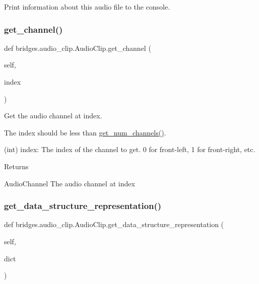 Print information about this audio file to the console. 

\mbox{\label{classbridges_1_1audio__clip_1_1_audio_clip_a9e322508117351585d6f3d22e2ccb3bc}} 
\subsubsection{\texorpdfstring{get\+\_\+channel()}{get\_channel()}}
{\footnotesize\ttfamily def bridges.\+audio\+\_\+clip.\+Audio\+Clip.\+get\+\_\+channel (\begin{DoxyParamCaption}\item[{}]{self,  }\item[{}]{index }\end{DoxyParamCaption})}



Get the audio channel at index. 

The index should be less than \hyperlink{classbridges_1_1audio__clip_1_1_audio_clip_af881900e292374fabf1f53a253571e5f}{get\+\_\+num\+\_\+channels()}. \begin{DoxyVerb}       (int) index: The index of the channel to get. 0 for front-left, 1 for front-right, etc.
\end{DoxyVerb}
 \begin{DoxyReturn}{Returns}


Audio\+Channel The audio channel at index 
\end{DoxyReturn}
\mbox{\label{classbridges_1_1audio__clip_1_1_audio_clip_a58dcd978d0a48dd338f850d7fea3d993}} 
\subsubsection{\texorpdfstring{get\+\_\+data\+\_\+structure\+\_\+representation()}{get\_data\_structure\_representation()}}
{\footnotesize\ttfamily def bridges.\+audio\+\_\+clip.\+Audio\+Clip.\+get\+\_\+data\+\_\+structure\+\_\+representation (\begin{DoxyParamCaption}\item[{}]{self,  }\item[{}]{dict }\end{DoxyParamCaption})}



